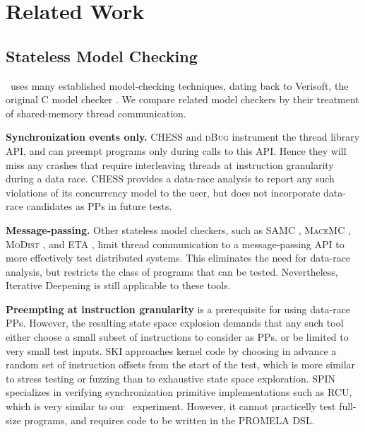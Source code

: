 \section{Related Work}


\subsection{Stateless Model Checking}

\landslide~uses many established model-checking techniques, dating back
to Verisoft, the original C model checker \cite{verisoft}.
We compare related model checkers by their treatment of shared-memory thread communication.

{\bf Synchronization events only.} CHESS \cite{chess} and \textsc{dBug} \cite{dbug-ssv} instrument the thread library API, and can preempt programs only during calls to this API.
Hence they will miss any crashes that require interleaving threads at instruction granularity during a data race. CHESS provides a data-race analysis to report any such violations of its concurrency model to the user, but does not incorporate data-race candidates as PPs in future tests.

{\bf Message-passing.} Other stateless model checkers, such as SAMC \cite{samc}, \textsc{MaceMC} \cite{macemc}, \textsc{MoDist} \cite{modist}, and ETA \cite{dbug-retreat}, limit thread communication to a message-passing API to more effectively test distributed systems.
This eliminates the need for data-race analysis, but restricts the class of programs that can be tested.
Nevertheless, Iterative Deepening is still applicable to these tools.

{\bf Preempting at instruction granularity} is a prerequisite for using data-race PPs.
However, the resulting state space explosion demands that any such tool either
choose a small subset of instructions to consider as PPs.
or be limited to very small test inputs.
{\textsc SKI} \cite{ski} approaches kernel code by choosing in advance a random set of instruction offsets from the start of the test,
which is more similar to stress testing or fuzzing than to exhaustive state space exploration.
SPIN \cite{spin} specializes in verifying synchronization primitive implementations such as RCU, which is very similar to our \mxtest~experiment.
However, it cannot practicelly test full-size programs, and requires code to be written in the PROMELA DSL.

